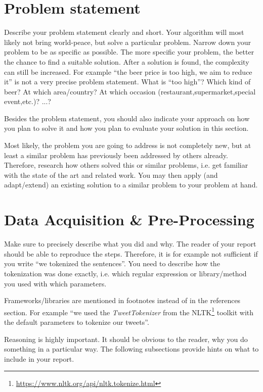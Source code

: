 \documentclass[sigconf]{acmart}
\begin{document}
\section{Problem statement}
Describe your problem statement clearly and short.
Your algorithm will most likely not bring world-peace, but solve a particular problem.
Narrow down your problem to be as specific as possible. 
The more specific your problem, the better the chance to find a suitable solution. After a solution is found, the complexity can still be increased.
For example ``the beer price is too high, we aim to reduce it'' is not a very precise problem statement. What is ``too high''? Which kind of beer? At which area/country? At which occasion (restaurant,supermarket,special event,etc.)? ...?

Besides the problem statement, you should also indicate your approach on how you plan to solve it and how you plan to evaluate your solution in this section.

Most likely, the problem you are going to address is not completely new, but at least a similar problem has previously been addressed by others already.
Therefore, research how others solved this or similar problems, i.e. get familiar with the state of the art and related work.
You may then apply (and adapt/extend) an existing solution to a similar problem to your problem at hand.

\section{Data Acquisition \& Pre-Processing}
Make sure to precisely describe what you did and why.
The reader of your report should be able to reproduce the steps.
Therefore, it is for example not sufficient if you write ``we tokenized the sentences''.
You need to describe how the tokenization was done exactly, i.e. which regular expression or library/method you used with which parameters.

Frameworks/libraries are mentioned in footnotes instead of in the references section.
For example ``we used the \emph{TweetTokenizer} from the NLTK\footnote{\url{https://www.nltk.org/api/nltk.tokenize.html}} toolkit with the default parameters to tokenize our tweets''.

Reasoning is highly important. 
It should be obvious to the reader, why you do something in a particular way.
The following subsections provide hints on what to include in your report.

\begin{center}
 \noindent{}

\end{center}
\end{document}
